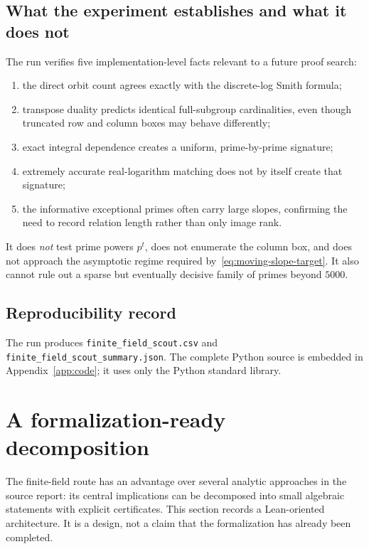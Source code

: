\documentclass[11pt]{article}
\theoremstyle{definition}
\theoremstyle{remark}
\begin{document}
\subsection{What the experiment establishes and what it does not}

The run verifies five implementation-level facts relevant to a future proof search:
\begin{enumerate}[label=\textup{(\arabic*)}]
\item the direct orbit count agrees exactly with the discrete-log Smith formula;
\item transpose duality predicts identical full-subgroup cardinalities, even though truncated row and column boxes may behave differently;
\item exact integral dependence creates a uniform, prime-by-prime signature;
\item extremely accurate real-logarithm matching does not by itself create that signature;
\item the informative exceptional primes often carry large slopes, confirming the need to record relation length rather than only image rank.
\end{enumerate}
It does \emph{not} test prime powers $p^t$, does not enumerate the column box, and does not approach the asymptotic regime required by~\eqref{eq:moving-slope-target}.  It also cannot rule out a sparse but eventually decisive family of primes beyond $5000$.

\subsection{Reproducibility record}

The run produces \texttt{finite\_field\_scout.csv} and
\texttt{finite\_field\_scout\_summary.json}. The complete Python source is embedded in
Appendix~\ref{app:code}; it uses only the Python standard library.

\section{A formalization-ready decomposition}
\label{sec:formalization}

The finite-field route has an advantage over several analytic approaches in the source report: its central implications can be decomposed into small algebraic statements with explicit certificates.  This section records a Lean-oriented architecture.  It is a design, not a claim that the formalization has already been completed.
\end{document}
